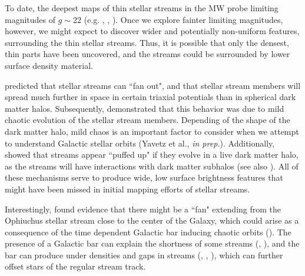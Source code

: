 \documentclass[twocolumn]{aastex62}
\newcommand{\todo}[1]{{\color{red} TODO: #1}}
\begin{document}
To date, the deepest maps of thin stellar streams in the MW probe limiting magnitudes of $g \sim 22$ (e.g. \citealt{Bernard:2016}, \citealt{Ibata:2016}, \citealt{deBoer:2018}). Once we explore fainter limiting magnitudes, however, we might expect to discover wider and potentially non-uniform features, surrounding the thin stellar streams. Thus, it is possible that only the densest, thin parts have been uncovered, and the streams could be surrounded by lower surface density material. 

\citet{Pearson:2015} predicted that stellar streams  can ``fan out", and that stellar stream members will spread much further in space in certain triaxial potentials than in spherical dark matter halos. Subsequently, \citet{Price-Whelan:2016} demonstrated that this behavior was due to mild chaotic evolution of the stellar stream members. Depending of the shape of the dark matter halo, mild chaos is an important factor to consider when we attempt to understand Galactic stellar orbits (Yavetz et al., {\it in prep.}). Additionally, \citealt{Bonaca:2014} showed that streams  appear ``puffed up" if they evolve in a live dark matter halo, as the streams will have interactions with dark matter subhalos  (see also \citealt{Ibata:2002}). All of these mechanisms serve to produce wide, low surface brightness features that might have been missed in initial mapping efforts of stellar streams. 

Interestingly, \citet{Sesar:2016} found evidence that there might be a ``fan" extending from the Ophiuchus stellar stream close to the center of the Galaxy, which could arise as a consequence of the time dependent Galactic bar inducing chaotic orbits (\citealt{Price-Whelan:2016b}). The presence of a Galactic bar can explain the shortness of some streams (\citealt{Hattori:2016}, \citealt{Pearson:2017}), and the bar can produce under densities and gaps in streams (\citealt{Erkal:2017}, \citealt{Pearson:2017}, \citealt{Banik:2019}), which can further offset stars of the regular stream track.


	
\end{document}
